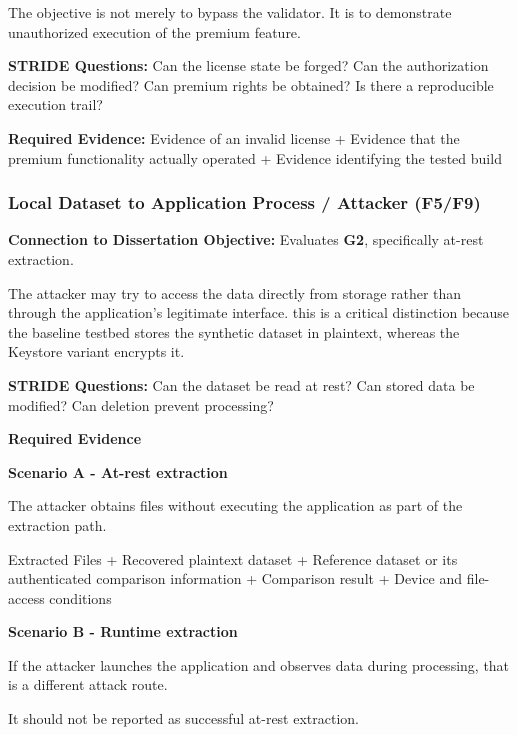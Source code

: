 \documentclass{article}
\begin{document}
\medbreak

The objective is not merely to bypass the validator. It is to demonstrate unauthorized execution of the premium feature.

\medbreak

\noindent\textbf{STRIDE Questions:} Can the license state be forged? Can the authorization decision be modified? Can premium rights be obtained? Is there a reproducible execution trail?

\noindent\textbf{Required Evidence:} Evidence of an invalid license + Evidence that the premium functionality actually operated + Evidence identifying the tested build

\subsubsection{Local Dataset to Application Process / Attacker (F5/F9)}

\textbf{Connection to Dissertation Objective:} Evaluates \textbf{G2}, specifically at-rest extraction.

\medbreak

The attacker may try to access the data directly from storage rather than through the application's legitimate interface. this is a critical distinction because the baseline testbed stores the synthetic dataset in plaintext, whereas the Keystore variant encrypts it.

\medbreak

\noindent\textbf{STRIDE Questions:} Can the dataset be read at rest? Can stored data be modified? Can deletion prevent processing?

\medbreak

\noindent\textbf{Required Evidence}

\medbreak

\textbf{Scenario A - At-rest extraction}

The attacker obtains files without executing the application as part of the extraction path.

Extracted Files + Recovered plaintext dataset + Reference dataset or its authenticated comparison information + Comparison result + Device and file-access conditions

\medbreak

\textbf{Scenario B - Runtime extraction}

If the attacker launches the application and observes data during processing, that is a different attack route.

It should not be reported as successful at-rest extraction.
\end{document}
